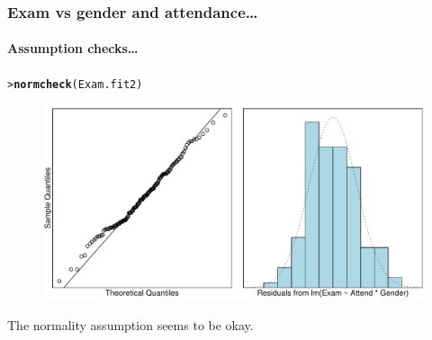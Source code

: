 \documentclass{beamer}\usepackage[]{graphicx}\usepackage[]{xcolor}
\makeatletter
\newcommand{\hlstd}[1]{\textcolor[rgb]{0.345,0.345,0.345}{#1}}%
\newcommand{\hlkwd}[1]{\textcolor[rgb]{0.737,0.353,0.396}{\textbf{#1}}}%
\newenvironment{kframe}{%
 \def\at@end@of@kframe{}%
 \ifinner\ifhmode%
  \def\at@end@of@kframe{\end{minipage}}%
  \begin{minipage}{\columnwidth}%
 \fi\fi%
 \def\FrameCommand##1{\hskip\@totalleftmargin \hskip-\fboxsep
 \colorbox{shadecolor}{##1}\hskip-\fboxsep
     \hskip-\linewidth \hskip-\@totalleftmargin \hskip\columnwidth}%
 \MakeFramed {\advance\hsize-\width
   \@totalleftmargin\z@ \linewidth\hsize
   \@setminipage}}%
 {\par\unskip\endMakeFramed%
 \at@end@of@kframe}
\newenvironment{knitrout}{}{} %
\makeatother
\begin{document}
\begin{frame}[fragile]
\frametitle{Exam vs gender and attendance\ldots}
\framesubtitle{Assumption checks\ldots}

\begin{knitrout}\scriptsize
{}\color{fgcolor}\begin{kframe}
\begin{alltt}
\hlstd{> }\hlkwd{normcheck}\hlstd{(Exam.fit2)}
\end{alltt}
\end{kframe}
\end{knitrout}



\begin{figure}
  \centering
  \includegraphics[scale = 0.5]{figure/RC-H12-024}
\end{figure}

The normality assumption seems to be okay.
\end{frame}
\end{document}
